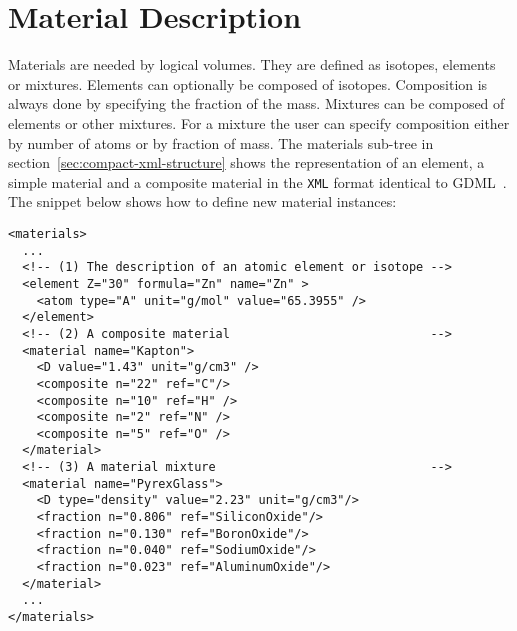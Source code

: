\section{Material Description}
\label{sec:compact-material-description}

Materials are needed by logical volumes. They are defined as isotopes,  elements or mixtures. Elements can optionally be composed of isotopes. Composition is always done by specifying the fraction of the mass. Mixtures can be composed of elements or other mixtures. For a mixture the user can specify composition either by number of atoms or by fraction of mass. The materials sub-tree in section~\ref{sec:compact-xml-structure} shows the representation of an element, a simple material and a  composite material in the \texttt{XML} format identical to GDML~\cite{Chytracek:2006be}. The snippet below shows how to define new material instances:
\begin{verbatim}
<materials>
  ...
  <!-- (1) The description of an atomic element or isotope -->
  <element Z="30" formula="Zn" name="Zn" >
    <atom type="A" unit="g/mol" value="65.3955" />
  </element>
  <!-- (2) A composite material                            -->
  <material name="Kapton">
    <D value="1.43" unit="g/cm3" />
    <composite n="22" ref="C"/>
    <composite n="10" ref="H" />
    <composite n="2" ref="N" />
    <composite n="5" ref="O" />
  </material>
  <!-- (3) A material mixture                              -->
  <material name="PyrexGlass">
    <D type="density" value="2.23" unit="g/cm3"/>
    <fraction n="0.806" ref="SiliconOxide"/>
    <fraction n="0.130" ref="BoronOxide"/>
    <fraction n="0.040" ref="SodiumOxide"/>
    <fraction n="0.023" ref="AluminumOxide"/>
  </material>
  ...
</materials>
\end{verbatim}


